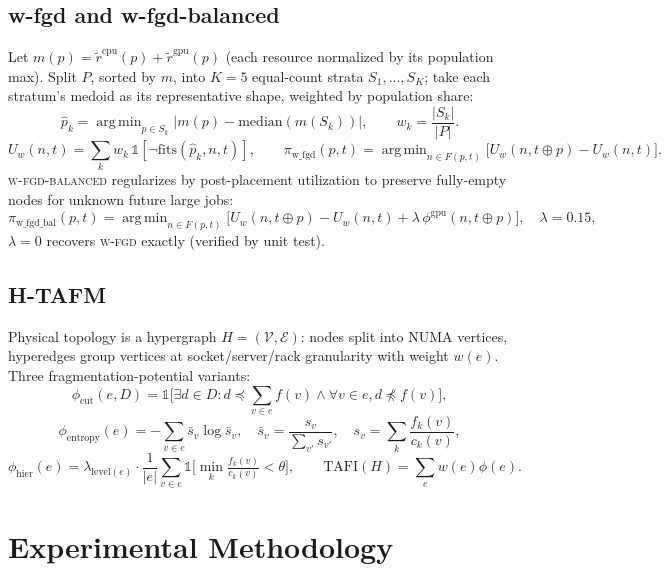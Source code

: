 \documentclass[12pt]{report}
\newcommand{\V}{\mathcal{V}}
\newcommand{\E}{\mathcal{E}}
\DeclareMathOperator*{\argmin}{arg\,min}
\begin{document}
\section{w-fgd and w-fgd-balanced}
Let $m(p)=\tilde r^{\text{cpu}}(p)+\tilde r^{\text{gpu}}(p)$
(each resource normalized by its population max). Split $P$, sorted by
$m$, into $K{=}5$ equal-count strata $S_1,\dots,S_K$; take each stratum's
medoid as its representative shape, weighted by population share:
\[
  \hat p_k=\argmin_{p\in S_k}|m(p)-\mathrm{median}(m(S_k))|, \qquad
  w_k=\frac{|S_k|}{|P|}.
\]
\[
  U_w(n,t)=\sum_k w_k\,\mathbb{1}[\neg\mathrm{fits}(\hat p_k,n,t)], \qquad
  \pi_{\text{w\_fgd}}(p,t)=\argmin_{n\in F(p,t)}\big[U_w(n,t{\oplus}p)-U_w(n,t)\big].
\]
\textsc{w-fgd-balanced} regularizes by post-placement utilization to
preserve fully-empty nodes for unknown future large jobs:
\[
  \pi_{\text{w\_fgd\_bal}}(p,t)=\argmin_{n\in F(p,t)}
  \Big[U_w(n,t{\oplus}p)-U_w(n,t) + \lambda\,\phi^{\text{gpu}}(n,t{\oplus}p)\Big],
  \quad \lambda=0.15,
\]
$\lambda=0$ recovers \textsc{w-fgd} exactly (verified by unit test).

\section{H-TAFM}
Physical topology is a hypergraph $H=(\V,\E)$: nodes split into NUMA
vertices, hyperedges group vertices at socket/server/rack granularity
with weight $w(e)$. Three fragmentation-potential variants:
\[
  \phi_{\text{cut}}(e,D)=\mathbb{1}\Big[\exists d{\in}D: d\preceq{\textstyle\sum_{v\in e}}f(v) \wedge \forall v{\in}e, d\not\preceq f(v)\Big],
\]
\[
  \phi_{\text{entropy}}(e)=-\sum_{v\in e}\bar s_v\log\bar s_v,\quad
  \bar s_v=\frac{s_v}{\sum_{v'}s_{v'}},\quad
  s_v=\sum_k \frac{f_k(v)}{c_k(v)},
\]
\[
  \phi_{\text{hier}}(e)=\lambda_{\text{level}(e)}\cdot\frac{1}{|e|}\sum_{v\in e}\mathbb{1}\Big[\min_k\tfrac{f_k(v)}{c_k(v)}<\theta\Big],
  \qquad
  \mathrm{TAFI}(H)=\sum_e w(e)\phi(e).
\]

\chapter{Experimental Methodology}
\label{ch:methodology}
\end{document}
